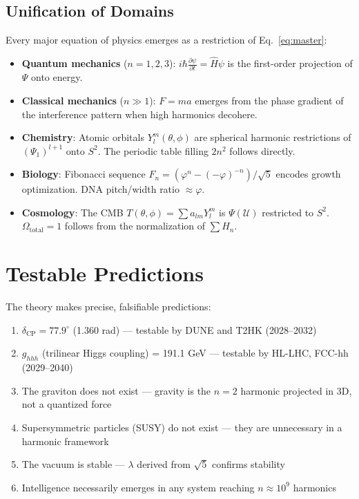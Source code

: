 \documentclass[12pt,a4paper]{article}
\begin{document}
\subsection{Unification of Domains}

Every major equation of physics emerges as a restriction of Eq.~\eqref{eq:master}:

\begin{itemize}
\item \textbf{Quantum mechanics} ($n=1,2,3$): $i\hbar \frac{\partial\psi}{\partial t} = \hat{H}\psi$ is the first-order projection of $\Psi$ onto energy.
\item \textbf{Classical mechanics} ($n \gg 1$): $F = ma$ emerges from the phase gradient of the interference pattern when high harmonics decohere.
\item \textbf{Chemistry}: Atomic orbitals $Y_l^m(\theta,\phi)$ are spherical harmonic restrictions of $(\Psi_1)^{l+1}$ onto $S^2$. The periodic table filling $2n^2$ follows directly.
\item \textbf{Biology}: Fibonacci sequence $F_n = (\varphi^n - (-\varphi)^{-n})/\sqrt{5}$ encodes growth optimization. DNA pitch/width ratio $\approx \varphi$.
\item \textbf{Cosmology}: The CMB $T(\theta,\phi) = \sum a_{lm} Y_l^m$ is $\Psi(\mathcal{U})$ restricted to $S^2$. $\Omega_\text{total} = 1$ follows from the normalization of $\sum H_n$.
\end{itemize}

\section{Testable Predictions}

The theory makes precise, falsifiable predictions:

\begin{enumerate}
\item $\delta_\text{CP} = 77.9^\circ$ (1.360 rad) --- testable by DUNE and T2HK (2028--2032)
\item $g_{hhh}$ (trilinear Higgs coupling) = 191.1 GeV --- testable by HL-LHC, FCC-hh (2029--2040)
\item The graviton does not exist --- gravity is the $n=2$ harmonic projected in 3D, not a quantized force
\item Supersymmetric particles (SUSY) do not exist --- they are unnecessary in a harmonic framework
\item The vacuum is stable --- $\lambda$ derived from $\sqrt{5}$ confirms stability
\item Intelligence necessarily emerges in any system reaching $n \approx 10^9$ harmonics
\end{enumerate}
\end{document}
